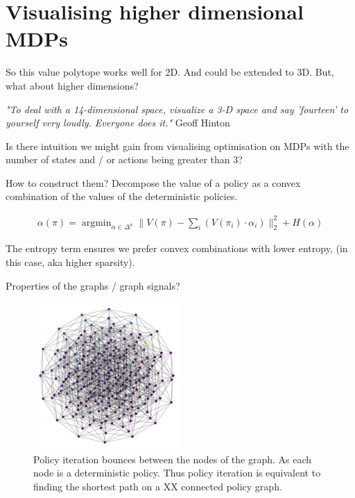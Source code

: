 \section{Visualising higher dimensional MDPs}\label{graph-vis}

So this value polytope works well for 2D. And could be extended to 3D. But, what about higher dimensions?

\begin{displayquote}
  \textit{"To deal with a 14-dimensional space, visualize a 3-D space and say 'fourteen' to yourself very loudly. Everyone does it."} Geoff Hinton
\end{displayquote}

Is there intuition we might gain from visualising optimisation on MDPs with the
number of states and / or actions being greater than 3?

How to construct them? Decompose the value of a policy as a convex combination
of the values of the deterministic policies.

\begin{align*}
  \alpha(\pi) = \mathop{\text{argmin}}_{\alpha \in \Delta^n} \parallel  V(\pi) - \sum_i (V(\pi_i) \cdot \alpha_i ) \parallel_2^2 + H(\alpha)
\end{align*}

The entropy term ensures we prefer convex combinations with lower entropy, (in this case, aka higher sparsity).

Properties of the graphs / graph signals?

\begin{figure}[!h]
\centering
\includegraphics[width=0.5\textwidth,height=0.3\textheight]{../../pictures/figures/discrete-graph.png}
\caption{Policy iteration bounces between the nodes of the graph. As each node is a deterministic policy.
Thus policy iteration is equivalent to finding the shortest path on a XX connected policy graph. }
\end{figure}

